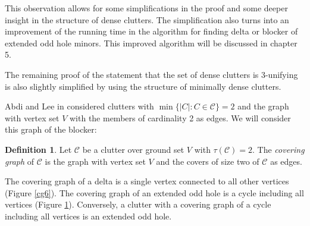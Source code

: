 \documentclass[a4paper, 12pt]{scrbook}
\theoremstyle{definition}
\newtheorem*{definition}{Definition}
\begin{document}
   This observation allows for some simplifications in the proof and some deeper insight in the structure of dense clutters.
   The simplification also turns into an improvement of the running time in the algorithm for finding delta or blocker of extended odd hole minors. This improved algorithm will be discussed in chapter 5.

The remaining proof of the statement that the set of dense clutters is 3-unifying is also slightly simplified by using the structure of minimally dense clutters.

Abdi and Lee in \cite{deltas} considered clutters with $\min\{|C|:C\in \mathcal{C}\}=2$ and the graph with vertex set $V$ with the members of cardinality 2 as edges. We will consider this graph of the blocker:

   \begin{definition}
       Let $\mathcal{C}$ be a clutter over ground set $V$ with $\tau(\mathcal{C})=2$.
       The \emph{covering graph} of $\mathcal{C}$ is the graph with vertex set $V$ and the covers of size two of $\mathcal{C}$ as edges.
   \end{definition}
   The covering graph of a delta is a single vertex connected to all other vertices (Figure \ref*{cg6}).
   The covering graph of an extended odd hole is a cycle including all vertices (Figure \ref*{cg5}). Conversely, a clutter with a covering graph of a cycle including all vertices is an extended odd hole.

    \begin{figure}[h]
        \centering
        \begin{minipage}{.4\textwidth}
            \centering
            \label{cg6}
        \end{minipage}
        \begin{minipage}{.5\textwidth}
            \centering
            \label{cg5}
        \end{minipage}
    \end{figure}
\end{document}
